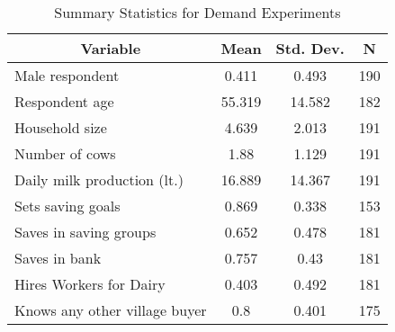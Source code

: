 
\begin{table}[htbp]\centering \caption{Summary Statistics for Demand Experiments \label{tab-sum-stats}}
\begin{tabular}{l c c  c}\hline\hline
\multicolumn{1}{c}{\textbf{Variable}} & \textbf{Mean}
 & \textbf{Std. Dev.} & \textbf{N}\\ \hline
Male respondent & 0.411 & 0.493  & 190\\
Respondent age & 55.319 & 14.582  & 182\\
Household size & 4.639 & 2.013  & 191\\
Number of cows & 1.88 & 1.129  & 191\\
Daily milk production (lt.) & 16.889 & 14.367  & 191\\
Sets saving goals & 0.869 & 0.338  & 153\\
Saves in saving groups & 0.652 & 0.478  & 181\\
Saves in bank & 0.757 & 0.43  & 181\\
Hires Workers for Dairy & 0.403 & 0.492  & 181\\
Knows any other village buyer & 0.8 & 0.401  & 175\\
\hline\end{tabular}
\end{table}
